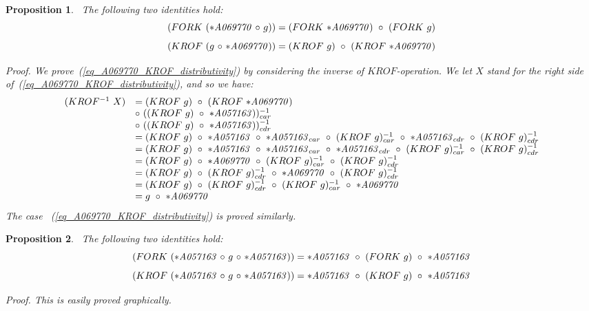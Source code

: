 \documentclass[11pt]{article} %
\newtheorem{propo}{Proposition}
\newcommand{\eqn}[1]{(\ref{#1})}
\newcommand{\eeq}{\end{equation}}
\newcommand{\beql}[1]{\begin{equation}\label{#1}}
\newcommand{\autname}[1]{{\it *#1}}
\newcommand{\funapply}{\ensuremath{\circ}}
\begin{document}
\begin{propo}~\label{propo_A069770_FORK_and_KROF_distributivity}
\normalfont
The following two identities hold:
\beql{eq_A069770_FORK_distributivity}
(FORK~(\autname{A069770}~{\funapply}~g)) = (FORK~\autname{A069770})~\funapply~(FORK~g)
\eeq
\beql{eq_A069770_KROF_distributivity}
(KROF~(g~{\funapply}~\autname{A069770})) = (KROF~g)~\funapply~(KROF~\autname{A069770})
\eeq

\textit{Proof}.
We prove~\eqn{eq_A069770_KROF_distributivity}
by considering the inverse
of $KROF$-operation. We let $X$ stand for the right side of~\eqn{eq_A069770_KROF_distributivity},
and so we have:
\beql{proof_of_A069770_KROF_distributivity}
\begin{array}{l l}
(KROF^{-1}~X) & = (KROF~g)~\funapply~(KROF~\autname{A069770}) \\
 & \funapply~((KROF~g)~\funapply~\autname{A057163}))^{-1}_{car} \\
 & \funapply~((KROF~g)~\funapply~\autname{A057163}))^{-1}_{cdr} \\
 & = (KROF~g)~\funapply~\autname{A057163}~\funapply~\autname{A057163}_{car}~\funapply~(KROF~g)^{-1}_{car}~\funapply~\autname{A057163}_{cdr}~\funapply~(KROF~g)^{-1}_{cdr} \\
 & = (KROF~g)~\funapply~\autname{A057163}~\funapply~\autname{A057163}_{car}~\funapply~\autname{A057163}_{cdr}~\funapply~(KROF~g)^{-1}_{car}~\funapply~(KROF~g)^{-1}_{cdr} \\
 & = (KROF~g)~\funapply~\autname{A069770}~\funapply~(KROF~g)^{-1}_{car}~\funapply~(KROF~g)^{-1}_{cdr} \\
 & = (KROF~g)~\funapply~(KROF~g)^{-1}_{cdr}~\funapply~\autname{A069770}~\funapply~(KROF~g)^{-1}_{cdr} \\
 & = (KROF~g)~\funapply~(KROF~g)^{-1}_{cdr}~\funapply~(KROF~g)^{-1}_{car}~\funapply~\autname{A069770} \\
 & = g~\funapply~\autname{A069770} \\
\end{array}
\eeq
The case ~\eqn{eq_A069770_KROF_distributivity}
is proved similarly.
\end{propo}

\begin{propo}~\label{propo_A069770_conjugation_inside_FORK_or_KROF}
\normalfont
The following two identities hold:
\beql{eq_A069770_conjugation_inside_FORK}
(FORK~(\autname{A057163}~{\funapply}~g~{\funapply}~\autname{A057163})) = \autname{A057163}~\funapply~(FORK~g)~\funapply~\autname{A057163}
\eeq
\beql{eq_A069770_conjugation_inside_KROF}
(KROF~(\autname{A057163}~{\funapply}~g~{\funapply}~\autname{A057163})) = \autname{A057163}~\funapply~(KROF~g)~\funapply~\autname{A057163}
\eeq

\textit{Proof}.
This is easily proved graphically.
\end{propo}
\end{document}
